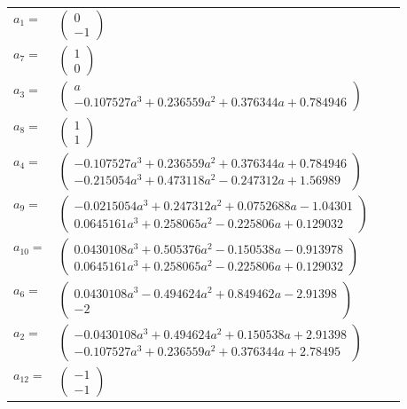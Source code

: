 \documentclass[1p]{elsarticle_modified}
\theoremstyle{definition}
\begin{document}
\begin{tabular}{m{7pt} m{180pt} m{7pt} m{180pt} }
\flushright $a_{1}=$&$\begin{pmatrix}0\\-1\end{pmatrix}$ \\
\flushright $a_{7}=$&$\begin{pmatrix}1\\0\end{pmatrix}$ \\
\flushright $a_{3}=$&$\begin{pmatrix}a\\-0.107527 a^{3}+0.236559 a^{2}+0.376344 a+0.784946\end{pmatrix}$ \\
\flushright $a_{8}=$&$\begin{pmatrix}1\\1\end{pmatrix}$ \\
\flushright $a_{4}=$&$\begin{pmatrix}-0.107527 a^{3}+0.236559 a^{2}+0.376344 a+0.784946\\-0.215054 a^{3}+0.473118 a^{2}-0.247312 a+1.56989\end{pmatrix}$ \\
\flushright $a_{9}=$&$\begin{pmatrix}-0.0215054 a^{3}+0.247312 a^{2}+0.0752688 a-1.04301\\0.0645161 a^{3}+0.258065 a^{2}-0.225806 a+0.129032\end{pmatrix}$ \\
\flushright $a_{10}=$&$\begin{pmatrix}0.0430108 a^{3}+0.505376 a^{2}-0.150538 a-0.913978\\0.0645161 a^{3}+0.258065 a^{2}-0.225806 a+0.129032\end{pmatrix}$ \\
\flushright $a_{6}=$&$\begin{pmatrix}0.0430108 a^{3}-0.494624 a^{2}+0.849462 a-2.91398\\-2\end{pmatrix}$ \\
\flushright $a_{2}=$&$\begin{pmatrix}-0.0430108 a^{3}+0.494624 a^{2}+0.150538 a+2.91398\\-0.107527 a^{3}+0.236559 a^{2}+0.376344 a+2.78495\end{pmatrix}$ \\
\flushright $a_{12}=$&$\begin{pmatrix}-1\\-1\end{pmatrix}$ \\

\end{tabular}
\end{document}
